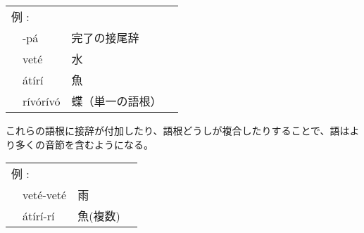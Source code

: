 \begin{tabular}{llll}
    \multicolumn{2}{l}{例 : } \\ 
    & -p\'a & 完了の接尾辞 \\
    & vet\'e & 水 \\
    & \'at\'ir\'i & 魚 \\
    & r\'iv\'or\'iv\'o & 蝶（単一の語根） \\
\end{tabular}

これらの語根に接辞が付加したり、語根どうしが複合したりすることで、語はより多くの音節を含むようになる。

\begin{tabular}{llll}
    \multicolumn{2}{l}{例 : } \\ 
    & vet\'e-vet\'e & 雨 \\
    & \'at\'ir\'i-r\'i & 魚(複数) \\
\end{tabular}